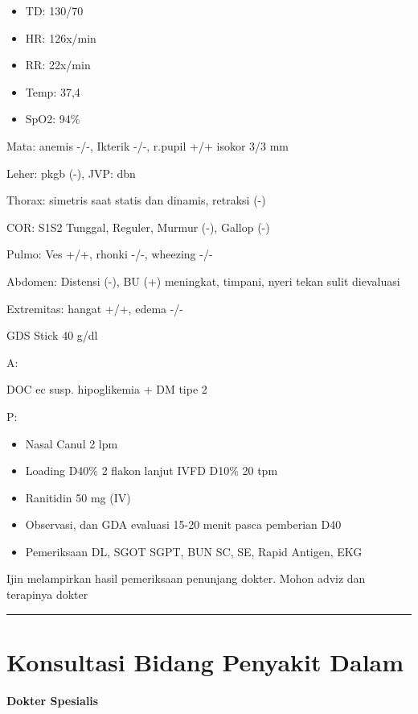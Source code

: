 \documentclass[
]{book}
\providecommand{\tightlist}{%
  \setlength{\itemsep}{0pt}\setlength{\parskip}{0pt}}
\begin{document}
\begin{itemize}
\item
  TD: 130/70
\item
  HR: 126x/min
\item
  RR: 22x/min
\item
  Temp: 37,4
\item
  SpO2: 94\%
\end{itemize}

Mata: anemis -/-, Ikterik -/-, r.pupil +/+ isokor 3/3 mm

Leher: pkgb (-), JVP: dbn

Thorax: simetris saat statis dan dinamis, retraksi (-)

COR: S1S2 Tunggal, Reguler, Murmur (-), Gallop (-)

Pulmo: Ves +/+, rhonki -/-, wheezing -/-

Abdomen: Distensi (-), BU (+) meningkat, timpani, nyeri tekan sulit dievaluasi

Extremitas: hangat +/+, edema -/-

GDS Stick 40 g/dl

A:

DOC ec susp. hipoglikemia + DM tipe 2

P:

\begin{itemize}
\tightlist
\item
  Nasal Canul 2 lpm
\item
  Loading D40\% 2 flakon lanjut IVFD D10\% 20 tpm
\item
  Ranitidin 50 mg (IV)
\item
  Observasi, dan GDA evaluasi 15-20 menit pasca pemberian D40
\item
  Pemeriksaan DL, SGOT SGPT, BUN SC, SE, Rapid Antigen, EKG
\end{itemize}

Ijin melampirkan hasil pemeriksaan penunjang dokter.
Mohon adviz dan terapinya dokter

\begin{center}\rule{0.5\linewidth}{0.5pt}\end{center}

\hypertarget{konsultasi-bidang-penyakit-dalam}{%
\section{Konsultasi Bidang Penyakit Dalam}\label{konsultasi-bidang-penyakit-dalam}}

\textbf{Dokter Spesialis}
\end{document}

